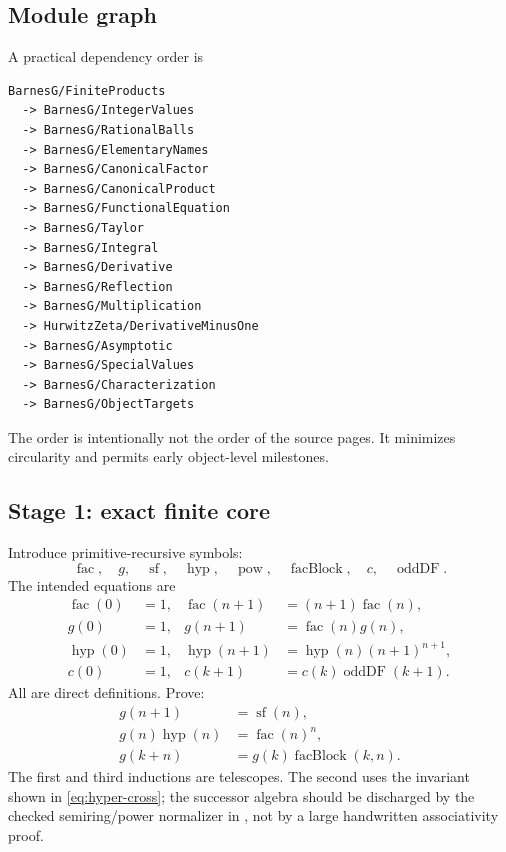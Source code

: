 \subsection{Module graph}

A practical dependency order is
\begin{verbatim}
BarnesG/FiniteProducts
  -> BarnesG/IntegerValues
  -> BarnesG/RationalBalls
  -> BarnesG/ElementaryNames
  -> BarnesG/CanonicalFactor
  -> BarnesG/CanonicalProduct
  -> BarnesG/FunctionalEquation
  -> BarnesG/Taylor
  -> BarnesG/Integral
  -> BarnesG/Derivative
  -> BarnesG/Reflection
  -> BarnesG/Multiplication
  -> HurwitzZeta/DerivativeMinusOne
  -> BarnesG/Asymptotic
  -> BarnesG/SpecialValues
  -> BarnesG/Characterization
  -> BarnesG/ObjectTargets
\end{verbatim}
The order is intentionally not the order of the source pages.  It minimizes
circularity and permits early object-level milestones.

\subsection{Stage 1: exact finite core}

Introduce primitive-recursive symbols:
\[
 \operatorname{fac},\quad g,\quad \operatorname{sf},\quad
 \operatorname{hyp},\quad \operatorname{pow},\quad
 \operatorname{facBlock},\quad c,\quad \operatorname{oddDF}.
\]
The intended equations are
\begin{align*}
 \operatorname{fac}(0)&=1,&
 \operatorname{fac}(n+1)&=(n+1)\operatorname{fac}(n),\\
 g(0)&=1,&g(n+1)&=\operatorname{fac}(n)g(n),\\
 \operatorname{hyp}(0)&=1,&
 \operatorname{hyp}(n+1)&=\operatorname{hyp}(n)(n+1)^{n+1},\\
 c(0)&=1,&c(k+1)&=c(k)\operatorname{oddDF}(k+1).
\end{align*}
All are direct  definitions.  Prove:
\begin{align}
 g(n+1)&=\operatorname{sf}(n),\label{eq:lean-sf-target}\\
 g(n)\operatorname{hyp}(n)&=\operatorname{fac}(n)^n,
 \label{eq:lean-hyp-target}\\
 g(k+n)&=g(k)\operatorname{facBlock}(k,n).
 \label{eq:lean-block-target}
\end{align}
The first and third inductions are telescopes.  The second uses the invariant
shown in \cref{eq:hyper-cross}; the successor algebra should be discharged by
the checked semiring/power normalizer in , not by a large
handwritten associativity proof.

